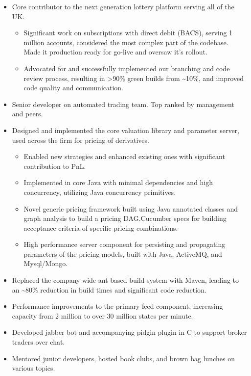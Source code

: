 \documentclass[11pt,a4paper,roman]{moderncv}
\begin{document}
\begin{itemize}
\item Core contributor to the next generation lottery platform serving all of the UK.\@
  \begin{itemize}
  \item Significant work on subscriptions with direct debit (BACS), serving 1 million accounts, considered the most complex part of the codebase. Made it production ready for go-live and oversaw it's rollout.
  \item Advocated for and successfully implemented our branching and code review process, resulting in >90\% green builds from \textasciitilde10\%, and improved code quality and communication.
  \end{itemize}
\end{itemize}

\vspace{5mm}

\clearpage
{}
\begin{itemize}
\item Senior developer on automated trading team. Top ranked by management and peers.
\item Designed and implemented the core valuation library and parameter server, used across the firm for pricing of derivatives.
  \begin{itemize}
  \item Enabled new strategies and enhanced existing ones with significant contribution to PnL.
  \item Implemented in core Java with minimal dependencies and high concurrency, utilizing Java concurrency primitives.
  \item Novel generic pricing framework built using Java annotated classes and graph analysis to build a pricing DAG.\@ Cucumber specs for building acceptance criteria of specific pricing combinations.
  \item High performance server component for persisting and propagating parameters of the pricing models, built with Java, ActiveMQ, and Mysql/Mongo.
  \end{itemize}
\item Replaced the company wide ant-based build system with Maven, leading to an \textasciitilde80\% reduction in build times and significant code reduction.
\item Performance improvements to the primary feed component, increasing capacity from 2 million to over 30 million states per minute.
\item Developed jabber bot and accompanying pidgin plugin in C to support broker traders over chat.
\item Mentored junior developers, hosted book clubs, and brown bag lunches on various topics.
\end{itemize}
\end{document}
